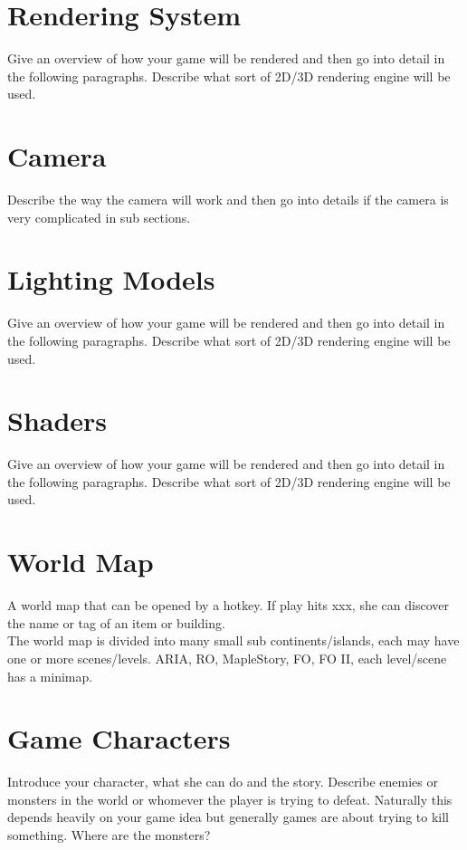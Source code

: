 \documentclass[11pt]{article}
\begin{document}
  \section{Rendering System}
    Give an overview of how your game will be rendered and then go into detail in the following paragraphs. Describe what sort of 2D/3D rendering engine will be used.

  \section{Camera}
    Describe the way the camera will work and then go into details if the camera is very complicated in sub sections.

  \section{Lighting Models}
    Give an overview of how your game will be rendered and then go into detail in the following paragraphs. Describe what sort of 2D/3D rendering engine will be used.

  \section{Shaders}
    Give an overview of how your game will be rendered and then go into detail in the following paragraphs. Describe what sort of 2D/3D rendering engine will be used.

  \section{World Map}
    A world map that can be opened by a hotkey. If play hits xxx, she can discover the name or tag of an item or building.\\
    The world map is divided into many small sub continents/islands, each may have one or more scenes/levels.
    ARIA, RO, MapleStory, FO, FO II, each level/scene has a minimap.

  \section{Game Characters}
    Introduce your character, what she can do and the story. Describe enemies or monsters in the world or whomever the player is trying to defeat. Naturally this depends heavily on your game idea but generally games are about trying to kill something. Where are the monsters?
\end{document}
